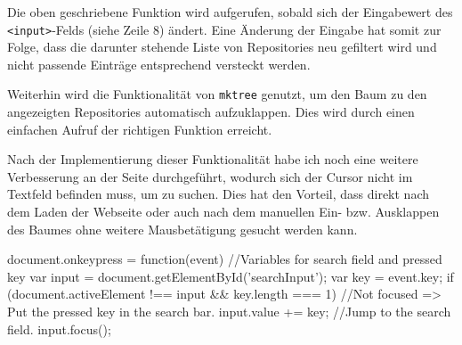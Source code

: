 \documentclass[xcolor=dvipsnames,11pt,paper=a4paper]{report}
\begin{document}

Die oben geschriebene Funktion wird aufgerufen, sobald sich der Eingabewert des
\texttt{<input>}-Felds (siehe Zeile 8) ändert. Eine Änderung der Eingabe hat somit
zur Folge, dass die darunter stehende Liste von Repositories neu gefiltert wird
und nicht passende Einträge entsprechend versteckt werden.

Weiterhin wird die Funktionalität von \texttt{mktree} genutzt, um den Baum zu den
angezeigten Repositories automatisch aufzuklappen. Dies wird durch einen einfachen
Aufruf der richtigen Funktion erreicht.

Nach der Implementierung dieser Funktionalität habe ich noch eine weitere Verbesserung
an der Seite durchgeführt, wodurch sich der Cursor nicht im Textfeld befinden muss,
um zu suchen. Dies hat den Vorteil, dass direkt nach dem Laden der Webseite oder
auch nach dem manuellen Ein- bzw. Ausklappen des Baumes ohne weitere Mausbetätigung
gesucht werden kann.

\begin{code}[language=javascript, caption={Funktion für Suche auf Tastendruck}]
document.onkeypress = function(event) {
	//Variables for search field and pressed key
	var input = document.getElementById('searchInput');
	var key = event.key;
	if (document.activeElement !== input && key.length === 1) {
		//Not focused => Put the pressed key in the search bar.
		input.value += key;
	}
	//Jump to the search field.
	input.focus();
}
\end{code}
\end{document}
